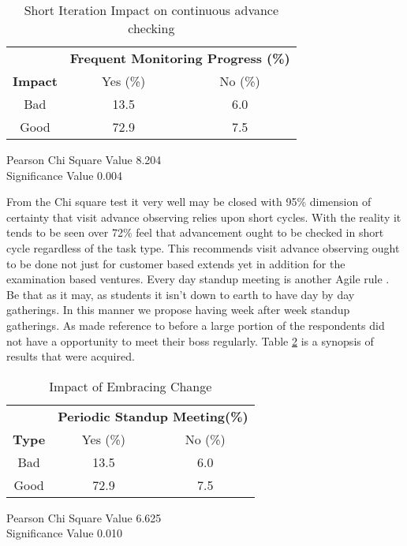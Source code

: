 \begin{table}[htbp]
	\caption{Short Iteration Impact on continuous advance checking}
	\begin{center}
		\renewcommand\arraystretch{2}
		\begin{tabular}{|c|c|c|}
			\hline
			\textbf{}&\multicolumn{2}{c|}{\textbf{Frequent Monitoring Progress (\%)}}
			\\ \cline{2-3}
			\textbf{Impact} & Yes (\%) & No (\%)
			\\ \hline
			Bad & 13.5 & 6.0
			\\ \hline
			Good & 72.9 & 7.5
			\\ \hline
		\end{tabular}
	\end{center}
	Pearson Chi Square Value  8.204
	\\ Significance Value 0.004
	\label{table:progressMonitoring}
\end{table}

From the Chi square test it very well may be closed with 95\% dimension of certainty that visit advance observing relies upon short cycles. With the reality it tends to be seen over 72\% feel that advancement ought to be checked in short cycle regardless of the task type. This recommends visit advance observing ought to be done not just for customer based extends yet in addition for the examination based ventures. 
Every day standup meeting is another Agile rule \cite{agilemanifesto}. Be that as it may, as students it isn't down to earth to have day by day gatherings.  In this manner we propose having week after week standup gatherings. As made reference to before a large portion of the respondents did not have a opportunity to meet their boss regularly. Table \ref{table:weeklyStandup} is a synopsis of results that were acquired.

\begin{table}[htbp]
	\caption{Impact of Embracing Change}
	\begin{center}
		\renewcommand\arraystretch{2}
		\begin{tabular}{|c|c|c|}
			\hline
			\textbf{}&\multicolumn{2}{c|}{\textbf{Periodic Standup Meeting(\%)}}
			\\ \cline{2-3}
			\textbf{Type} & Yes (\%) & No (\%)
			\\ \hline
			Bad & 13.5 & 6.0
			\\ \hline
			Good & 72.9 & 7.5
			\\ \hline
		\end{tabular}
	\end{center}
	Pearson Chi Square Value 6.625
	\\Significance Value 0.010
	\label{table:weeklyStandup}
\end{table}


